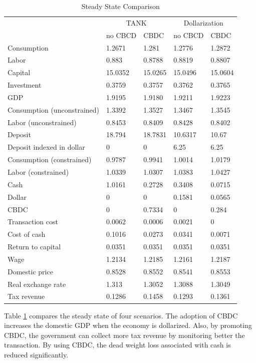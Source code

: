 \documentclass[12pt]{article}
\begin{document}
\begin{table}[h!]
\centering
\scriptsize
\begin{tabular}{lllll}
\hline\hline
                 &\multicolumn{2}{c}{TANK}  &\multicolumn{2}{c}{Dollarization}  \\
                 &  no CBCD & CBDC & no CBCD &  CBDC  \\\hline
Consumption                 & 1.2671  & 1.281   & 1.2776  & 1.2872  \\
Labor                       & 0.883   & 0.8788  & 0.8819  & 0.8807  \\
Capital                     & 15.0352 & 15.0265 & 15.0496 & 15.0604 \\
Investment                  & 0.3759  & 0.3757  & 0.3762  & 0.3765  \\
GDP       &     1.9195   & 1.9180  &  1.9211  &  1.9223  \\
Consumption (unconstrained) & 1.3392  & 1.3527  & 1.3467  & 1.3545  \\
Labor (unconstrained)       & 0.8453  & 0.8409  & 0.8428  & 0.8402  \\
Deposit                     & 18.794  & 18.7831 & 10.6317 & 10.67   \\
Deposit indexed in dollar   & 0       & 0       & 6.25    & 6.25    \\
Consumption (constrained)   & 0.9787  & 0.9941  & 1.0014  & 1.0179  \\
Labor (constrained)         & 1.0339  & 1.0307  & 1.0383  & 1.0427  \\
Cash                        & 1.0161  & 0.2728  & 0.3408  & 0.0715  \\
Dollar                      & 0       & 0       & 0.1581  & 0.0565  \\
CBDC                & 0       & 0.7334  & 0       & 0.284   \\
Transaction cost            & 0.0062  & 0.0006  & 0.0021  & 0       \\
Cost of cash                & 0.1016  & 0.0273  & 0.0341  & 0.0071  \\
Return to capital           & 0.0351  & 0.0351  & 0.0351  & 0.0351  \\
Wage                        & 1.2134  & 1.2185  & 1.2161  & 1.2187  \\
Domestic price              & 0.8528  & 0.8552  & 0.8541  & 0.8553  \\
Real exchange rate          & 1.313   & 1.3052  & 1.3088  & 1.3049  \\
Tax revenue                 & 0.1286  & 0.1458  & 0.1293  & 0.1361  \\\hline
\end{tabular}
\caption{Steady State Comparison}
\label{SS}
\end{table}
Table \ref{SS} compares the steady state of four scenarios. The adoption of CBDC increases the domestic GDP when the economy is dollarized. Also, by promoting CBDC, the government can collect more tax revenue by monitoring better the transaction. By using CBDC, the dead weight loss associated with cash is reduced significantly. 
      
\end{document}
